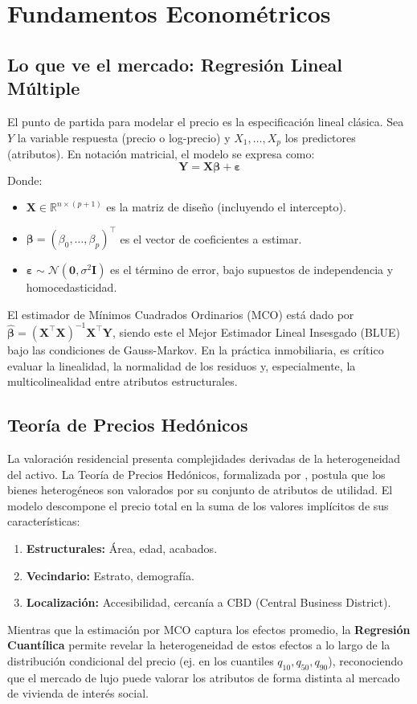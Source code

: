 \documentclass[12pt, a4paper, twoside, openright]{report}
\theoremstyle{plain}
\theoremstyle{definition}
\begin{document}
\section{Fundamentos Econométricos}

\subsection{Lo que ve el mercado: Regresión Lineal Múltiple}
El punto de partida para modelar el precio es la especificación lineal clásica. Sea $Y$ la variable respuesta (precio o log-precio) y $X_1,\dots,X_p$ los predictores (atributos). En notación matricial, el modelo se expresa como:
\begin{equation}
\mathbf{Y} = \mathbf{X}\boldsymbol{\beta} + \boldsymbol{\varepsilon}
\end{equation}
Donde:
\begin{itemize}
    \item $\mathbf{X} \in \mathbb{R}^{n\times (p+1)}$ es la matriz de diseño (incluyendo el intercepto).
    \item $\boldsymbol{\beta}=(\beta_0,\dots,\beta_p)^\top$ es el vector de coeficientes a estimar.
    \item $\boldsymbol{\varepsilon} \sim \mathcal{N}(\mathbf{0},\sigma^2\mathbf{I})$ es el término de error, bajo supuestos de independencia y homocedasticidad.
\end{itemize}

El estimador de Mínimos Cuadrados Ordinarios (MCO) está dado por $\hat{\boldsymbol{\beta}}=(\mathbf{X}^\top\mathbf{X})^{-1}\mathbf{X}^\top\mathbf{Y}$, siendo este el Mejor Estimador Lineal Insesgado (BLUE) bajo las condiciones de Gauss-Markov. En la práctica inmobiliaria, es crítico evaluar la linealidad, la normalidad de los residuos y, especialmente, la multicolinealidad entre atributos estructurales.

\subsection{Teoría de Precios Hedónicos}
La valoración residencial presenta complejidades derivadas de la heterogeneidad del activo. La Teoría de Precios Hedónicos, formalizada por \citet{rosen1974}, postula que los bienes heterogéneos son valorados por su conjunto de atributos de utilidad. El modelo descompone el precio total en la suma de los valores implícitos de sus características:
\begin{enumerate}
    \item \textbf{Estructurales:} Área, edad, acabados.
    \item \textbf{Vecindario:} Estrato, demografía.
    \item \textbf{Localización:} Accesibilidad, cercanía a CBD (Central Business District).
\end{enumerate}
Mientras que la estimación por MCO captura los efectos promedio, la \textbf{Regresión Cuantílica} permite revelar la heterogeneidad de estos efectos a lo largo de la distribución condicional del precio (ej. en los cuantiles $q_{10}, q_{50}, q_{90}$), reconociendo que el mercado de lujo puede valorar los atributos de forma distinta al mercado de vivienda de interés social.
\end{document}
